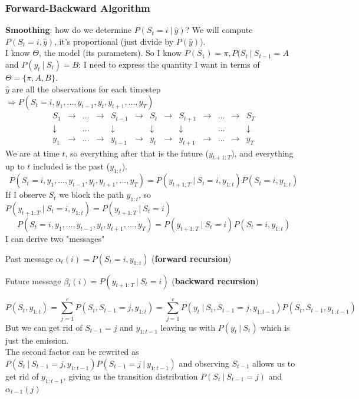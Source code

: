 \documentclass[10pt]{report}
\begin{document}
\subsubsection{Forward-Backward Algorithm} \textbf{Smoothing}: how do we determine $P(S_t = i\:|\:\hat{y})$? We will compute $P(S_t=i, \hat{y})$, it's proportional (just divide by $P(\hat{y})$).\\
I know $\Theta$, the model (its parameters). So I know $P(S_1) = \pi, P(S_t\:|\:S_{t-1} = A$ and $P(y_t\:|\:S_t) = B$: I need to express the quantity I want in terms of $\Theta=\{\pi,A,B\}$.\\
$\hat{y}$ are all the observations for each timestep $\Rightarrow P(S_t=i,y_1,\ldots,y_{t-1},y_t,y_{t+1},\ldots,y_T)$
$$\begin{array}{ccccccccccccc}
S_1&\rightarrow&\ldots&\rightarrow&S_{t-1}&\rightarrow&S_t&\rightarrow&S_{t+1}&\rightarrow&\ldots&\rightarrow&S_T\\
\downarrow& &\ldots& &\downarrow& &\downarrow& &\downarrow& &\ldots& &\downarrow\\
y_1&\rightarrow&\ldots&\rightarrow&y_{t-1}&\rightarrow&y_t&\rightarrow&y_{t+1}&\rightarrow&\ldots&\rightarrow&y_T
\end{array}$$
We are at time $t$, so everything after that is the future ($y_{t+1:T}$), and everything up to $t$ included is the past ($y_{1:t}$).
$$P(S_t=i,y_1,\ldots,y_{t-1},y_t,y_{t+1},\ldots,y_T) = P(y_{t+1:T}\:|\:S_t=i, y_{1:t}) P(S_t=i,y_{1:t})$$
If I observe $S_t$ we block the path $y_{1:t}$, so $P(y_{t+1:T}\:|\:S_t=i, y_{1:t}) = P(y_{t+1:T}\:|\:S_t=i)$
$$P(S_t=i,y_1,\ldots,y_{t-1},y_t,y_{t+1},\ldots,y_T) = P(y_{t+1:T}\:|\:S_t=i) P(S_t=i,y_{1:t})$$
I can derive two "messages"
\begin{list}{}{}
	\item Past message $\alpha_t(i) = P(S_t=i,y_{1:t})$ (\textbf{forward recursion})
	\item Future message $\beta_t(i) = P(y_{t+1:T}\:|\:S_t=i)$ (\textbf{backward recursion})
\end{list}
$$P(S_t,y_{1:t}) = \sum_{j=1}^c P(S_t, S_{t-1}=j,y_{1:t}) = \sum_{j=1}^c P(y_t\:|\:S_t, S_{t-1} = j, y_{1:t-1})P(S_t,S_{t-1},y_{1:t-1})$$
But we can get rid of $S_{t-1}=j$ and $y_{1:t-1}$ leaving us with $P(y_t\:|\:S_t)$ which is just the emission.\\
The second factor can be rewrited as $P(S_t\:|\:S_{t-1}=j,y_{1:t-1}) P (S_{t-1}=j\:|\:y_{1:t-1})$ and observing $S_{t-1}$ allows us to get rid of $y_{1:t-1}$, giving us the transition distribution $P(S_t\:|\:S_{t-1}=j)$ and $\alpha_{t-1}(j)$
\end{document}
